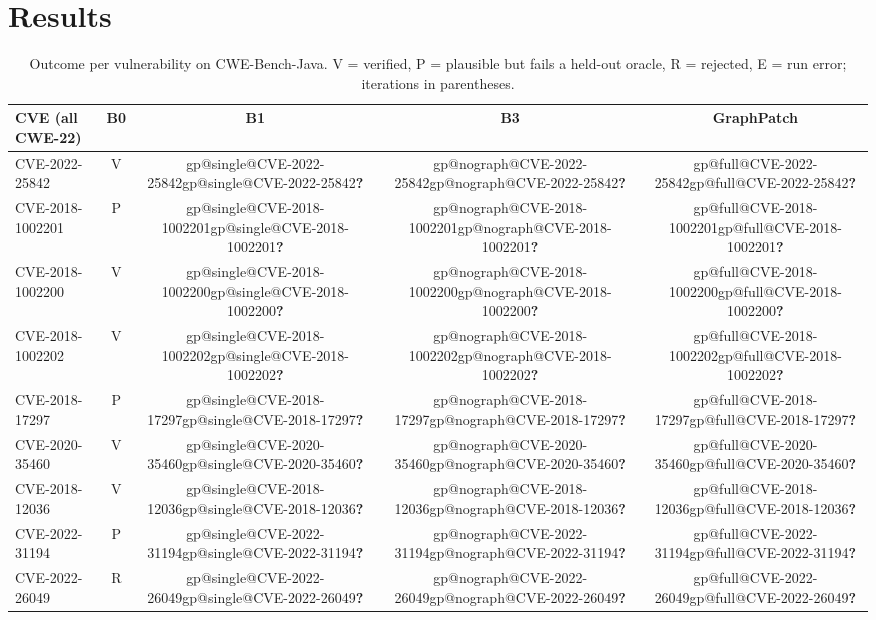 \documentclass[conference]{IEEEtran}
\makeatletter
\newcommand{\res}[1]{\ifcsname gp@#1\endcsname\csname gp@#1\endcsname\else\textbf{?}\fi}
\makeatother
\begin{document}
\section{Results}
\label{sec:results}

\begin{table}[t]
\centering
\caption{Outcome per vulnerability on CWE-Bench-Java. V = verified, P = plausible but
fails a held-out oracle, R = rejected, E = run error; iterations in parentheses.}
\label{tab:java}
\begin{tabular}{lcccc}
\toprule
CVE (all CWE-22) & B0 & B1 & B3 & GraphPatch \\
\midrule
CVE-2022-25842   & V & \res{single@CVE-2022-25842} & \res{nograph@CVE-2022-25842} & \res{full@CVE-2022-25842} \\
CVE-2018-1002201 & P & \res{single@CVE-2018-1002201} & \res{nograph@CVE-2018-1002201} & \res{full@CVE-2018-1002201} \\
CVE-2018-1002200 & V & \res{single@CVE-2018-1002200} & \res{nograph@CVE-2018-1002200} & \res{full@CVE-2018-1002200} \\
CVE-2018-1002202 & V & \res{single@CVE-2018-1002202} & \res{nograph@CVE-2018-1002202} & \res{full@CVE-2018-1002202} \\
CVE-2018-17297   & P & \res{single@CVE-2018-17297} & \res{nograph@CVE-2018-17297} & \res{full@CVE-2018-17297} \\
CVE-2020-35460   & V & \res{single@CVE-2020-35460} & \res{nograph@CVE-2020-35460} & \res{full@CVE-2020-35460} \\
CVE-2018-12036   & V & \res{single@CVE-2018-12036} & \res{nograph@CVE-2018-12036} & \res{full@CVE-2018-12036} \\
CVE-2022-31194   & P & \res{single@CVE-2022-31194} & \res{nograph@CVE-2022-31194} & \res{full@CVE-2022-31194} \\
CVE-2022-26049   & R & \res{single@CVE-2022-26049} & \res{nograph@CVE-2022-26049} & \res{full@CVE-2022-26049} \\
\bottomrule
\end{tabular}
\end{table}
\end{document}
